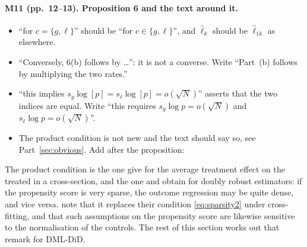 \documentclass[11pt]{article}
\newenvironment{ins}{\begin{leftbar}}{\end{leftbar}}
\theoremstyle{plain}
\theoremstyle{remark}
\begin{document}
\paragraph{M11 (pp.~12--13). Proposition 6 and the text around it.}
\begin{itemize}
\item ``for $c=\{g,\ell\}$'' should be ``for $c\in\{g,\ell\}$'', and
  $\hat\ell_k$ should be $\hat\ell_{1k}$ as elsewhere.
\item ``Conversely, 6(b) follows by \dots'': it is not a converse. Write
  ``Part~(b) follows by multiplying the two rates.''
\item ``this implies $s_g\log[p]=s_\ell\log[p]=o(\sqrt N)$'' asserts that the two
  indices are equal. Write ``this requires $s_g\log p=o(\sqrt N)$ and
  $s_\ell\log p=o(\sqrt N)$''.
\item The product condition is not new and the text should say so, see
  Part~\ref{sec:obvious}. Add after the proposition:
\end{itemize}
\begin{ins}
The product condition is the one \textcite[Remark~5.2]{chernozhukov2018double}
give for the average treatment effect on the treated in a cross-section, and the
one \textcite{farrell2015robust} and \textcite{smucler2019unifying} obtain for
doubly robust estimators: if the propensity score is very sparse, the outcome
regression may be quite dense, and vice versa.
\textcite[footnote~13]{kolesar2026fragility} note that it replaces their
condition \eqref{eq:sparsity2} under cross-fitting, and that such assumptions on
the propensity score are likewise sensitive to the normalisation of the
controls. The rest of this section works out that remark for DML-DiD.
\end{ins}
\end{document}
